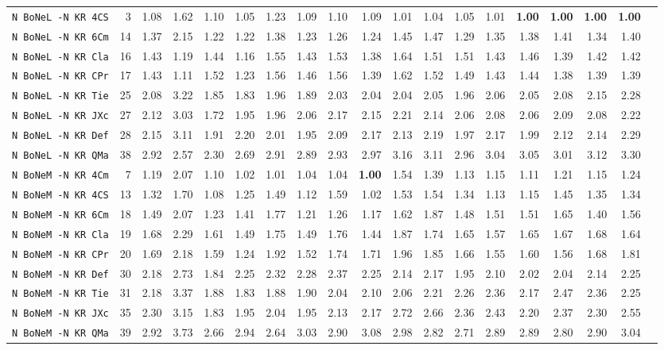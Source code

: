 \begin{tabular}{l | r @{~~} r | r@{~~}r@{~~}r@{~~}r@{~~}r@{~~}r@{~~}r@{~~}r@{~~}r@{~~}r@{~~}r@{~~}r@{~~}r@{~~}r@{~~}r@{~~}r|}
\verb+N BoNeL -N KR 4CS+ & 3 & 1.08 & 1.62&1.10&1.05&1.23&1.09&1.10&1.09&1.01&1.04&1.05&1.01&\textbf{1.00}&\textbf{1.00}&\textbf{1.00}&\textbf{1.00}\\
\verb+N BoNeL -N KR 6Cm+ & 14 & 1.37 & 2.15&1.22&1.22&1.38&1.23&1.26&1.24&1.45&1.47&1.29&1.35&1.38&1.41&1.34&1.40\\
\verb+N BoNeL -N KR Cla+ & 16 & 1.43 & 1.19&1.44&1.16&1.55&1.43&1.53&1.38&1.64&1.51&1.51&1.43&1.46&1.39&1.42&1.42\\
\verb+N BoNeL -N KR CPr+ & 17 & 1.43 & 1.11&1.52&1.23&1.56&1.46&1.56&1.39&1.62&1.52&1.49&1.43&1.44&1.38&1.39&1.39\\
\verb+N BoNeL -N KR Tie+ & 25 & 2.08 & 3.22&1.85&1.83&1.96&1.89&2.03&2.04&2.04&2.05&1.96&2.06&2.05&2.08&2.15&2.28\\
\verb+N BoNeL -N KR JXc+ & 27 & 2.12 & 3.03&1.72&1.95&1.96&2.06&2.17&2.15&2.21&2.14&2.06&2.08&2.06&2.09&2.08&2.22\\
\verb+N BoNeL -N KR Def+ & 28 & 2.15 & 3.11&1.91&2.20&2.01&1.95&2.09&2.17&2.13&2.19&1.97&2.17&1.99&2.12&2.14&2.29\\
\verb+N BoNeL -N KR QMa+ & 38 & 2.92 & 2.57&2.30&2.69&2.91&2.89&2.93&2.97&3.16&3.11&2.96&3.04&3.05&3.01&3.12&3.30\smallskip \\
\verb+N BoNeM -N KR 4Cm+ & 7 & 1.19 & 2.07&1.10&1.02&1.01&1.04&1.04&\textbf{1.00}&1.54&1.39&1.13&1.15&1.11&1.21&1.15&1.24\\
\verb+N BoNeM -N KR 4CS+ & 13 & 1.32 & 1.70&1.08&1.25&1.49&1.12&1.59&1.02&1.53&1.54&1.34&1.13&1.15&1.45&1.35&1.34\\
\verb+N BoNeM -N KR 6Cm+ & 18 & 1.49 & 2.07&1.23&1.41&1.77&1.21&1.26&1.17&1.62&1.87&1.48&1.51&1.51&1.65&1.40&1.56\\
\verb+N BoNeM -N KR Cla+ & 19 & 1.68 & 2.29&1.61&1.49&1.75&1.49&1.76&1.44&1.87&1.74&1.65&1.57&1.65&1.67&1.68&1.64\\
\verb+N BoNeM -N KR CPr+ & 20 & 1.69 & 2.18&1.59&1.24&1.92&1.52&1.74&1.71&1.96&1.85&1.66&1.55&1.60&1.56&1.68&1.81\\
\verb+N BoNeM -N KR Def+ & 30 & 2.18 & 2.73&1.84&2.25&2.32&2.28&2.37&2.25&2.14&2.17&1.95&2.10&2.02&2.04&2.14&2.25\\
\verb+N BoNeM -N KR Tie+ & 31 & 2.18 & 3.37&1.88&1.83&1.88&1.90&2.04&2.10&2.06&2.21&2.26&2.36&2.17&2.47&2.36&2.25\\
\verb+N BoNeM -N KR JXc+ & 35 & 2.30 & 3.15&1.83&1.95&2.04&1.95&2.13&2.17&2.72&2.66&2.36&2.43&2.20&2.37&2.30&2.55\\
\verb+N BoNeM -N KR QMa+ & 39 & 2.92 & 3.73&2.66&2.94&2.64&3.03&2.90&3.08&2.98&2.82&2.71&2.89&2.89&2.80&2.90&3.04\smallskip \\

\end{tabular}
